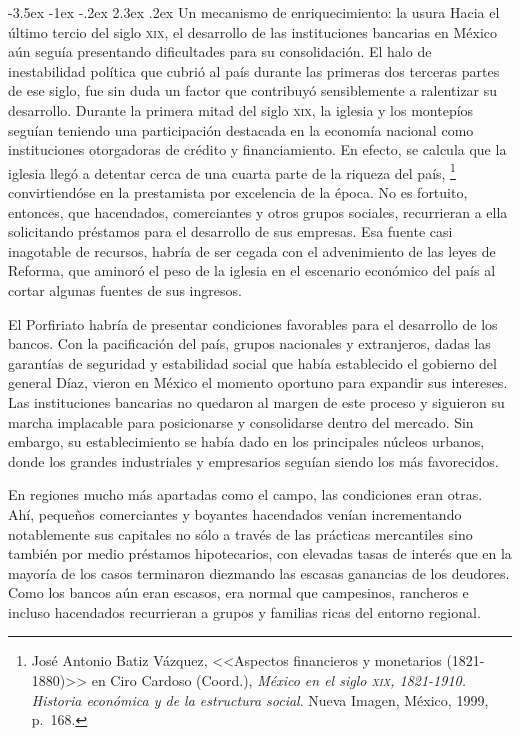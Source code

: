 \documentclass[14pt,twoside,final]{extbook} %
\makeatletter
\let\oldfootnote\footnote
\renewcommand\footnote[1]{%
\oldfootnote{\hspace{1mm}#1}}
\renewcommand\section{\@startsection {section}{1}{\z@}%
                                     {-3.5ex \@plus -1ex \@minus -.2ex}%
                                     {2.3ex \@plus .2ex}%
                                     {\normalfont\large\bfseries\sc}}
\makeatother
\begin{document}
\section{Un mecanismo de enriquecimiento: la usura}\label{sec:usura}
Hacia el último tercio del siglo \textsc{xix}, el desarrollo de las instituciones bancarias en México aún seguía presentando dificultades para su consolidación. El halo de inestabilidad política que cubrió al país durante las primeras dos terceras partes de ese siglo, fue sin duda un factor que
contribuyó sensiblemente a ralentizar su desarrollo. Durante la primera mitad del siglo \textsc{xix}, la iglesia y los montepíos seguían teniendo una participación destacada en la economía nacional como instituciones otorgadoras de crédito y financiamiento. En efecto, se calcula que la iglesia llegó a detentar cerca de una cuarta parte de la riqueza del país,\footnote{José Antonio Batiz Vázquez, <<Aspectos financieros y monetarios (1821-1880)>> en Ciro Cardoso (Coord.), \emph{México en el siglo \textsc{xix}, 1821-1910. Historia económica y de la estructura social}. Nueva Imagen, México, 1999, p.~168.} convirtiendóse en la prestamista por excelencia de la época. No es fortuito, entonces, que hacendados, comerciantes y otros grupos sociales, recurrieran a ella solicitando préstamos para el desarrollo de sus empresas. Esa fuente casi inagotable de recursos, habría de ser cegada con el advenimiento de las leyes de Reforma, que aminoró el peso de la iglesia en el escenario económico del país al cortar algunas fuentes de sus ingresos.

El Porfiriato habría de presentar condiciones favorables para el desarrollo de los bancos. Con la pacificación del país, grupos nacionales y extranjeros, dadas las garantías de seguridad y estabilidad social que había establecido el gobierno del general Díaz, vieron en México el momento oportuno para expandir sus intereses. Las instituciones bancarias no quedaron al margen de este proceso y siguieron su marcha implacable para posicionarse y consolidarse dentro del mercado. Sin embargo, su establecimiento se había dado en los principales núcleos urbanos, donde los grandes industriales y empresarios seguían siendo los más favorecidos.

En regiones mucho más apartadas como el campo, las condiciones eran otras. Ahí, pequeños comerciantes y boyantes hacendados venían incrementando notablemente sus capitales no sólo a través de las prácticas mercantiles sino también por medio préstamos hipotecarios, con elevadas tasas de interés que en la mayoría de los casos terminaron diezmando las escasas ganancias de los deudores. Como los
bancos aún eran escasos, era normal que campesinos, rancheros e incluso hacendados recurrieran a grupos y familias ricas del entorno regional.
\end{document}
